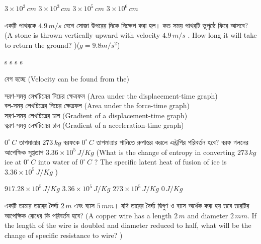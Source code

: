 \documentclass[addpoints]{exam}
\begin{document}
\begin{questions}
\begin{oneparchoices}
\choice $ 3\times 10^{3}\,cm $
\choice $ 3\times 10^{3}\,cm $
\choice $ 3\times 10^{5}\,cm $
\choice $ 3\times 10^{6}\,cm $
\end{oneparchoices}


\question  একটি পাথরকে $ 4.9\,m/s $ বেগে সোজা উপরের দিকে নিক্ষেপ করা হল। কত সময় পাথরটি ভূপৃষ্ঠে ফিরে আসবে? (A stone is thrown vertically upward with velocity $ 4.9\,m/s $ . How long it will take to return the ground? )($ g=9.8m/s^{2} $)

\begin{oneparchoices}
 s
 s
 s
 s
\end{oneparchoices}

\question  বেগ হচ্ছে (Velocity can be found from the)

\begin{oneparchoices}
\choice সরণ-সময় লেখচিত্রের নিচের ক্ষেত্রফল (Area under the displacement-time graph)\\
\hspace*{-.3cm}\choice বল-সময় লেখচিত্রের নিচের ক্ষেত্রফল (Area under the force-time graph)\\
\hspace*{-.3cm}\choice সরণ-সময় লেখচিত্রের ঢাল (Gradient of a displacement-time graph)\\
\hspace*{-.3cm}\choice ত্বরণ-সময় লেখচিত্রের ঢাল (Gradient of a acceleration-time graph)

\end{oneparchoices}

\question $ 0^{\circ}\,C $ তাপমাত্রার $ 273\,kg $ বরফকে $ 0^{\circ}\,C $ তাপমাত্রার পানিতে রুপান্তর করলে এন্ট্রপির পরিবর্তন হবে? বরফ গলনের আপেক্ষিক সুপ্ততাপ $ 3.36\times 10^{5}\, J/Kg$ (What is the change of entropy in converting $ 273\,kg $ ice at $ 0^{\circ}\,C $ into water of $ 0^{\circ}\,C $ ? The specific latent heat of fusion of ice is $ 3.36\times 10^{5}\, J/Kg$ )
 
\begin{oneparchoices}
\choice $ 917.28\times 10^{5}\, J/Kg$
\choice $ 3.36\times 10^{5}\, J/Kg$
\choice $ 273\times 10^{5}\, J/Kg$
\choice $ 0\, J/Kg$
\end{oneparchoices}

\question  একটি তামার তারের দৈর্ঘ্য $ 2\,m $ এবং ব্যাস $ 5\,mm $। যদি তারের দৈর্ঘ্য দ্বিগুণ ও ব্যাস অর্ধেক করা হয় তবে তারটির আপেক্ষিক রোধের কি পরিবর্তন হবে? (A copper wire has a length $ 2\,m $ and diameter $ 2\,mm $. If the length of the wire is doubled and diameter reduced to half, what will be the change of specific resistance to wire? ) 


\end{questions}
\end{document}
